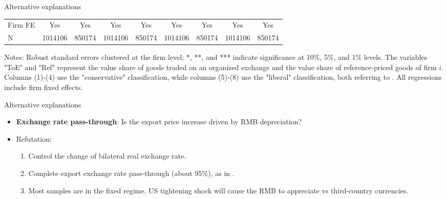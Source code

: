 \documentclass[10pt]{beamer}
\begin{document}
\begin{frame}{Alternative explanations}
\begin{table}[htbp]
{\begin{threeparttable}
\begin{tabular}{lcccccccc}
        \midrule
        Firm FE & Yes   & Yes   & Yes   & Yes   & Yes   & Yes   & Yes   & Yes \\
        N     & 1014106 & 850174 & 1014106 & 850174 & 1014106 & 850174 & 1014106 & 850174 \\
            \bottomrule
        \end{tabular}
            \begin{tablenotes}
                \footnotesize
                \item Notes: Robust standard errors clustered at the firm level;  *, **, and *** indicate significance at 10\%, 5\%, and 1\% levels. The variables "ToE" and "Ref" represent the value share of goods traded on an organized exchange and the value share of reference-priced goods of firm $i$. Columns (1)-(4) use the "conservative" classification, while columns (5)-(8) use the "liberal" classification, both referring to \cite{rauch1999networks}. All regressions include firm fixed effects.
    	\end{tablenotes}
        \end{threeparttable}
        }
        \label{tab.rauch}
    \end{table}
\end{frame}

\begin{frame}[label=alt_erpt]{Alternative explanations}
    \begin{itemize}
        \item \textbf{Exchange rate pass-through}: Is the export price increase driven by RMB depreciation?
        \item Refutation:
        \begin{enumerate}
            \item Control the change of bilateral real exchange rate. \hyperlink{appendix_tab.altagg}{}
            \item Complete export exchange rate pass-through (about 95\%), as in \cite{li2015exchange}.
            \item Most samples are in the fixed regime. US tightening shock will cause the RMB to appreciate vs third-country currencies.
        \end{enumerate}
        
    \end{itemize}
\end{frame}

\end{document}
